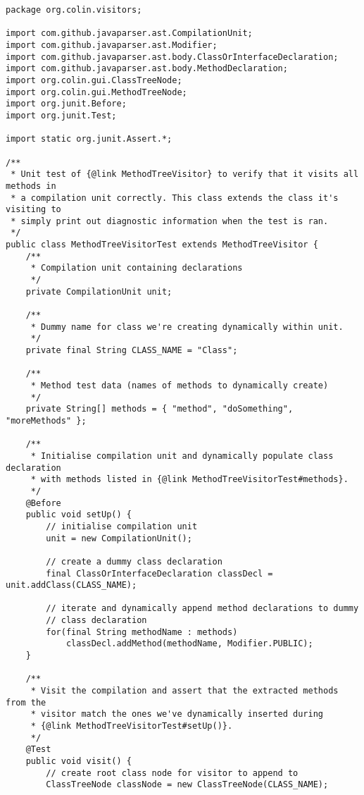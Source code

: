 \documentclass[9pt]{article}
\renewenvironment{framed}[1][\hsize]
   {\MakeFramed{\hsize#1\advance\hsize-\width \FrameRestore}}%
   {\endMakeFramed}
\begin{document}
			\begin{framed}[1.2\textwidth]	
				\begin{verbatim}
package org.colin.visitors;

import com.github.javaparser.ast.CompilationUnit;
import com.github.javaparser.ast.Modifier;
import com.github.javaparser.ast.body.ClassOrInterfaceDeclaration;
import com.github.javaparser.ast.body.MethodDeclaration;
import org.colin.gui.ClassTreeNode;
import org.colin.gui.MethodTreeNode;
import org.junit.Before;
import org.junit.Test;

import static org.junit.Assert.*;

/**
 * Unit test of {@link MethodTreeVisitor} to verify that it visits all methods in
 * a compilation unit correctly. This class extends the class it's visiting to
 * simply print out diagnostic information when the test is ran.
 */
public class MethodTreeVisitorTest extends MethodTreeVisitor {
    /**
     * Compilation unit containing declarations
     */
    private CompilationUnit unit;

    /**
     * Dummy name for class we're creating dynamically within unit.
     */
    private final String CLASS_NAME = "Class";

    /**
     * Method test data (names of methods to dynamically create)
     */
    private String[] methods = { "method", "doSomething", "moreMethods" };

    /**
     * Initialise compilation unit and dynamically populate class declaration
     * with methods listed in {@link MethodTreeVisitorTest#methods}.
     */
    @Before
    public void setUp() {
        // initialise compilation unit
        unit = new CompilationUnit();

        // create a dummy class declaration
        final ClassOrInterfaceDeclaration classDecl = unit.addClass(CLASS_NAME);

        // iterate and dynamically append method declarations to dummy
        // class declaration
        for(final String methodName : methods)
            classDecl.addMethod(methodName, Modifier.PUBLIC);
    }

    /**
     * Visit the compilation and assert that the extracted methods from the
     * visitor match the ones we've dynamically inserted during
     * {@link MethodTreeVisitorTest#setUp()}.
     */
    @Test
    public void visit() {
        // create root class node for visitor to append to
        ClassTreeNode classNode = new ClassTreeNode(CLASS_NAME);


\end{verbatim}
\end{framed}
\end{document}
